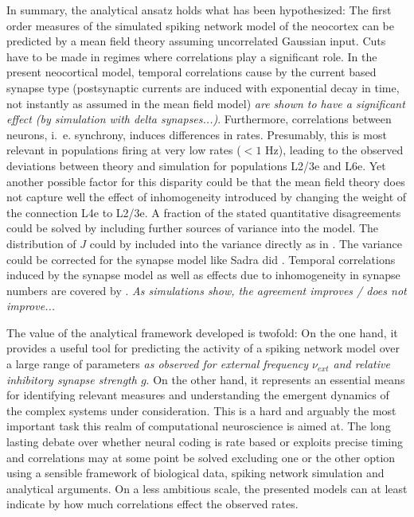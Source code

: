 In summary, the analytical ansatz holds what has been hypothesized: 
The first order measures of the simulated spiking network model of the neocortex 
can be predicted by a mean field theory assuming uncorrelated Gaussian input.
Cuts have to be made in regimes where correlations play a significant role. 
In the present neocortical model, temporal correlations 
cause by the current based synapse type (postsynaptic currents are induced with 
exponential decay in time, not instantly as assumed in the mean field model)
\emph{are shown to have a significant effect (by simulation with delta synapses...)}. 
Furthermore, correlations between neurons, i.~e. synchrony, induces differences in 
rates. Presumably, this is most relevant in populations firing at very low rates ($< 1$ Hz), 
leading to the observed deviations between theory and simulation for populations 
L2/3e and L6e. Yet another possible factor for this disparity could be that the
mean field theory does not capture well the effect of inhomogeneity introduced 
by changing the weight of the connection L4e to L2/3e. 
A fraction of the stated quantitative disagreements could be solved by 
including further sources of variance into the model.
The distribution of $J$ could by included into the variance directly as
in \cite{amit1997model}. The variance could be corrected for the synapse 
model like Sadra did \cite{sadeh2014mean}. Temporal correlations induced
by the synapse model as well as effects due to inhomogeneity in synapse 
numbers are covered by \cite{brunel1999fast}. 
\emph{As simulations show, the agreement improves / does not improve...}

The value of the analytical framework developed is twofold: On the one hand, 
it provides a useful tool for predicting the activity of a spiking network model
over a large range of parameters \emph{as observed for external frequency $\nu_{ext}$ 
and relative inhibitory synapse strength $g$}. On the other hand, it represents an
essential means for identifying relevant measures and understanding the emergent 
dynamics of the complex systems under consideration. This is a hard and arguably the 
most important task this realm of computational neuroscience is aimed at. The long lasting
debate over whether neural coding is rate based or exploits precise timing and correlations
may at some point be solved excluding one or the other option using a sensible framework
of biological data, spiking network simulation and analytical arguments. 
On a less ambitious scale, the presented models can at least indicate by how much 
correlations effect the observed rates. 

